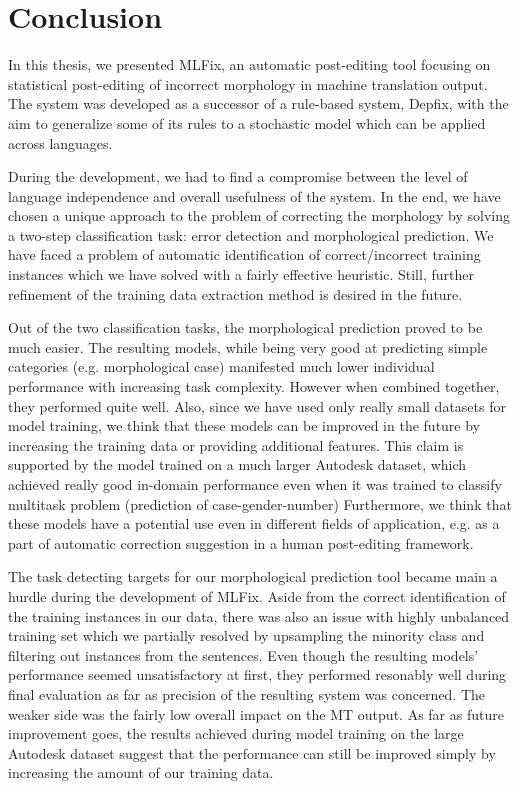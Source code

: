 \chapter{Conclusion}
\label{chap:conclusion}

In this thesis, we presented MLFix, an automatic post-editing tool focusing on statistical
post-editing of incorrect morphology in machine translation output. The system was
developed as a successor of a rule-based system, Depfix, with the aim to generalize some of its
rules to a stochastic model which can be applied across languages.

During the development, we had to find a compromise between the level of language independence
and overall usefulness of the system. In the end, we have chosen a unique approach to the problem of correcting
the morphology by solving a two-step classification task: error detection and morphological prediction.
We have faced a problem of automatic identification of correct/incorrect training instances
which we have solved with a fairly effective heuristic. Still, further refinement of the
training data extraction method is desired in the future.

Out of the two classification tasks, the morphological prediction proved to be much easier.
The resulting models, while being very good at predicting simple categories (e.g. morphological case)
manifested much lower individual performance with increasing task complexity. However when
combined together, they performed quite well.
Also, since we have used only really small datasets for model training, we think that these models
can be improved in the future by increasing the training data or providing additional features.
This claim is supported by the model trained on a much larger Autodesk dataset, which achieved really good
in-domain performance even when it was trained to classify multitask problem (prediction of case-gender-number)
Furthermore, we think that
these models have a potential use even in different fields of application, e.g. as a part of automatic
correction suggestion in a human post-editing framework.

The task detecting targets for our morphological prediction tool became main a hurdle
during the development of MLFix. Aside from the correct identification of the training instances
in our data, there was also an issue with highly unbalanced training set which we partially resolved
by upsampling the minority class and filtering out instances from the  sentences.
Even though the resulting models' performance seemed unsatisfactory at first, they performed resonably
well during final evaluation as far as precision of the resulting system was concerned. The weaker
side was the fairly low overall impact on the MT output. As far as future improvement goes, the results
achieved during model training on the large Autodesk dataset suggest that the performance can still be
improved simply by increasing the amount of our training data.

